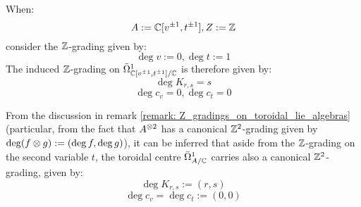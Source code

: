 \begin{remark}
            When:
                $$A := \mathbb{C}[v^{\pm 1}, t^{\pm 1}], Z := \mathbb{Z}$$
            consider the $\mathbb{Z}$-grading given by:
                $$\deg v := 0, \deg t := 1$$
            The induced $\mathbb{Z}$-grading on $\bar{\Omega}^1_{\mathbb{C}[v^{\pm 1}, t^{\pm 1}]/\mathbb{C}}$ is therefore given by:
                $$\deg K_{r, s} = s$$
                $$\deg c_v = 0, \deg c_t = 0$$
        \end{remark}
        \begin{remark} \label{remark: Z^2_grading_on_toroidal_centres}
            From the discussion in remark \ref{remark: Z_gradings_on_toroidal_lie_algebras} (particular, from the fact that $A^{\tensor 2}$ has a canonical $\mathbb{Z}^2$-grading given by $\deg(f \tensor g) := (\deg f, \deg g)$), it can be inferred that aside from the $\mathbb{Z}$-grading on the second variable $t$, the toroidal centre $\bar{\Omega}^1_{A/\mathbb{C}}$ carries also a canonical $\mathbb{Z}^2$-grading, given by:
                $$\deg K_{r, s} := (r, s)$$
                $$\deg c_v = \deg c_t := (0, 0)$$
        \end{remark}